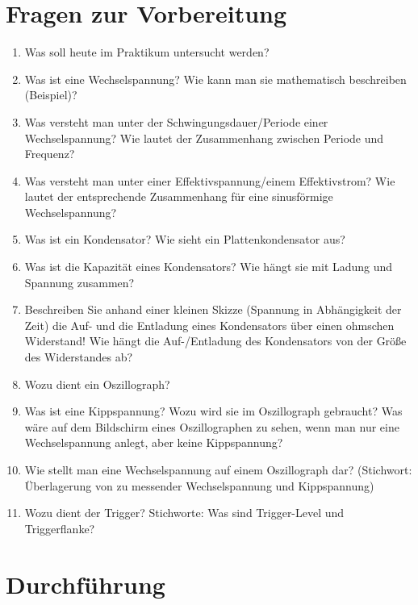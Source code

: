 \section{Fragen zur Vorbereitung}

\begin{enumerate}
 \item Was soll heute im Praktikum untersucht werden? 
 \item Was ist eine Wechselspannung? Wie kann man sie mathematisch beschreiben (Beispiel)? 
 \item Was versteht man unter der Schwingungsdauer/Periode einer Wechselspannung? Wie lautet der Zusammenhang zwischen Periode und Frequenz?
 \item Was versteht man unter einer Effektivspannung/einem Effektivstrom? Wie lautet der entsprechende Zusammenhang für eine sinusförmige Wechselspannung?
 \item Was ist ein Kondensator? Wie sieht ein Plattenkondensator aus?
 \item Was ist die Kapazität eines Kondensators? Wie hängt sie mit Ladung und Spannung zusammen?
 \item Beschreiben Sie anhand einer kleinen Skizze (Spannung in Abhängigkeit der Zeit) die Auf- und die Entladung eines Kondensators über einen ohmschen Widerstand! Wie hängt die Auf-/Entladung des Kondensators von der Größe des Widerstandes ab?
 \item Wozu dient ein Oszillograph?
 \item Was ist eine Kippspannung? Wozu wird sie im Oszillograph gebraucht? Was wäre auf dem Bildschirm eines Oszillographen zu sehen, wenn man nur eine Wechselspannung anlegt, aber keine Kippspannung?
 \item Wie stellt man eine Wechselspannung auf einem Oszillograph dar? (Stichwort: Überlagerung von zu messender Wechselspannung und Kippspannung)
 \item Wozu dient der Trigger? Stichworte: Was sind Trigger-Level und Triggerflanke?
\end{enumerate}

\section{Durchführung} 


